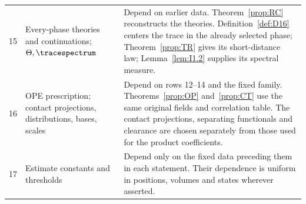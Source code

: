 \begin{longtable}{@{}p{}p{}p{}@{}}
15 & \raggedright Every-phase theories and continuations; $\Theta,\tracespectrum$ & Depend on earlier data. Theorem~\ref{prop:RC} reconstructs the theories. Definition~\ref{def:D16} centers the trace in the already selected phase; Theorem~\ref{prop:TR} gives its short-distance law; Lemma~\ref{lem:I1.2} supplies its spectral measure.\\[3pt]
16 & \raggedright OPE prescription; contact projections, distributions, bases, scales & Depend on rows 12--14 and the fixed family. Theorems~\ref{prop:OP} and~\ref{prop:CT} use the same original fields and correlation table. The contact projections, separating functionals and clearance are chosen separately from those used for the product coefficients.\\[3pt]
17 & \raggedright Estimate constants and thresholds & Depend only on the fixed data preceding them in each statement. Their dependence is uniform in positions, volumes and states wherever asserted.\\
\end{longtable}
\endgroup
